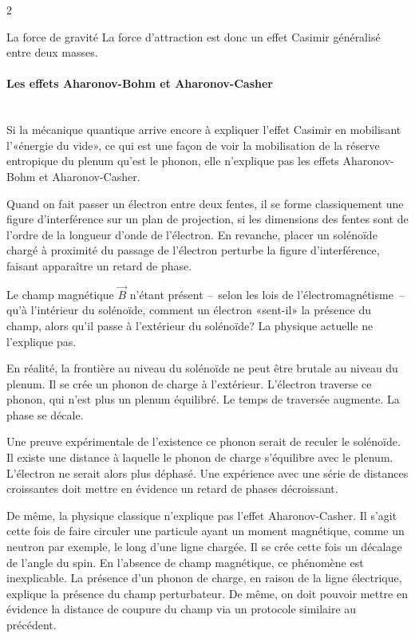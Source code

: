\begin{multicols}{2}
\begin{mybox}[breakable,colback=blue!10, colbacktitle=pkcolor]{La force de gravité}
	La force d'attraction est donc un effet Casimir généralisé entre deux
	masses.
\end{mybox}
\medskip


\paragraph{Les effets Aharonov-Bohm et Aharonov-Casher}~\\


Si la mécanique quantique arrive encore à expliquer l'effet Casimir en
mobilisant l'«énergie du vide», ce qui est une façon de voir la
mobilisation de la réserve entropique du plenum qu'est le phonon, elle
n'explique pas les effets Aharonov-Bohm et Aharonov-Casher.

Quand on fait passer un électron entre deux fentes, il se forme
classiquement une figure d'interférence sur un plan de projection, si
les dimensions des fentes sont de l'ordre de la longueur d'onde de
l'électron. En revanche, placer un solénoïde chargé à proximité du
passage de l'électron perturbe la figure d'interférence, faisant
apparaître un retard de phase.

Le champ magnétique $\vec B$ n'étant présent --~selon les lois de l'électromagnétisme~-- qu'à l'intérieur du solénoïde, comment un électron
«sent-il» la présence du champ, alors qu'il passe à l'extérieur du solénoïde? La
physique actuelle ne l'explique pas.

En réalité, la frontière au niveau du solénoïde ne peut être brutale
au niveau du plenum. Il se crée un phonon de charge à l'extérieur.
L'électron traverse ce phonon, qui n'est plus un plenum équilibré. Le
temps de traversée augmente. La phase se décale.

Une preuve expérimentale de l'existence ce phonon serait de reculer le solénoïde.
Il existe une distance à laquelle le phonon de charge s'équilibre avec
le plenum. L'électron ne serait alors plus déphasé. Une expérience
avec une série de distances croissantes doit mettre en évidence un
retard de phases décroissant.

De même, la physique classique n'explique pas l'effet Aharonov-Casher.
Il s'agit cette fois de faire circuler une particule ayant un moment
magnétique, comme un neutron par exemple, le long d'une ligne
chargée. Il se crée cette fois un décalage de l'angle du spin. En
l'absence de champ magnétique, ce phénomène est inexplicable. La
présence d'un phonon de charge, en raison de la ligne électrique,
explique la présence du champ perturbateur. De même, on doit pouvoir
mettre en évidence la distance de coupure du champ via un protocole
similaire au précédent.


\end{multicols}
